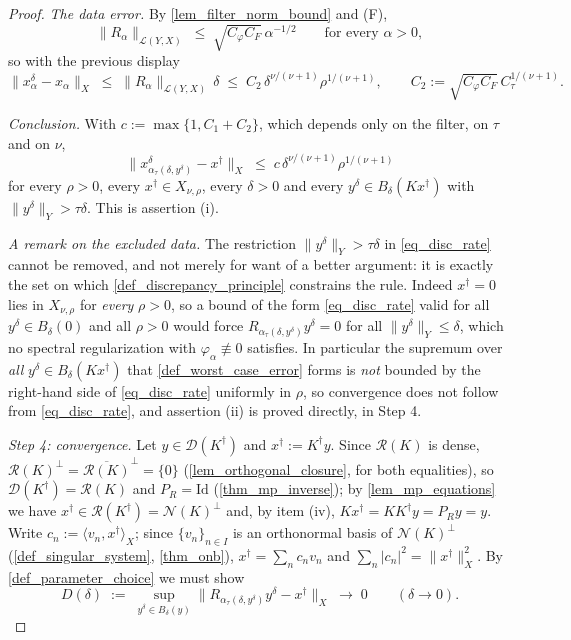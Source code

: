 \documentclass[a4paper]{report}
\theoremstyle{plain}
\theoremstyle{definition}
\theoremstyle{remark}
\newcommand{\Ll}{\mathcal{L}}
\newcommand{\Ran}{\mathcal{R}}
\newcommand{\Ker}{\mathcal{N}}
\newcommand{\Dom}{\mathcal{D}}
\newcommand{\Id}{\mathrm{Id}}
\newcommand{\dg}{^{\dagger}}
\begin{document}
\begin{proof}
  \emph{The data error.}  By \cref{lem_filter_norm_bound} and (F),
  \begin{equation}\label{eq_disc_dataerr}
    \|R_{\alpha}\|_{\Ll(Y,X)} \;\le\; \sqrt{C_{\varphi}C_F}\,\alpha^{-1/2}
    \qquad\text{for every } \alpha > 0 ,
  \end{equation}
  so with the previous display
  \[
    \|x^{\delta}_{\alpha} - x_{\alpha}\|_X \;\le\; \|R_{\alpha}\|_{\Ll(Y,X)}\,\delta
      \;\le\; C_2\,\delta^{\nu/(\nu+1)}\rho^{1/(\nu+1)},
    \qquad C_2 := \sqrt{C_{\varphi}C_F}\,C_{\tau}^{1/(\nu+1)} .
  \]

  \emph{Conclusion.}  With $c := \max\{1, C_1 + C_2\}$, which depends only on the filter,
  on $\tau$ and on $\nu$,
  \begin{equation}\label{eq_disc_rate}
    \|x^{\delta}_{\alpha_{\tau}(\delta,y^{\delta})} - x\dg\|_X \;\le\;
      c\,\delta^{\nu/(\nu+1)}\rho^{1/(\nu+1)}
  \end{equation}
  for every $\rho > 0$, every $x\dg \in X_{\nu,\rho}$, every $\delta > 0$ and every
  $y^{\delta} \in B_{\delta}(Kx\dg)$ with $\|y^{\delta}\|_Y > \tau\delta$.  This is
  assertion (i).

  \emph{A remark on the excluded data.}  The restriction $\|y^{\delta}\|_Y > \tau\delta$
  in \eqref{eq_disc_rate} cannot be removed, and not merely for want of a better
  argument: it is exactly the set on which \cref{def_discrepancy_principle} constrains
  the rule.  Indeed $x\dg = 0$ lies in $X_{\nu,\rho}$ for \emph{every} $\rho > 0$, so a
  bound of the form \eqref{eq_disc_rate} valid for all $y^{\delta} \in B_{\delta}(0)$ and
  all $\rho > 0$ would force $R_{\alpha_{\tau}(\delta,y^{\delta})}y^{\delta} = 0$ for all
  $\|y^{\delta}\|_Y \le \delta$, which no spectral regularization with
  $\varphi_{\alpha} \not\equiv 0$ satisfies.  In particular the supremum over
  \emph{all} $y^{\delta} \in B_{\delta}(Kx\dg)$ that \cref{def_worst_case_error} forms
  is \emph{not} bounded by the right-hand side of \eqref{eq_disc_rate} uniformly in
  $\rho$, so convergence does not follow from \eqref{eq_disc_rate}, and assertion (ii)
  is proved directly, in Step 4.

  \emph{Step 4: convergence.}  Let $y \in \Dom(K\dg)$ and $x\dg := K\dg y$.  Since
  $\Ran(K)$ is dense, $\Ran(K)^{\perp} = \overline{\Ran(K)}^{\perp} = \{0\}$
  (\cref{lem_orthogonal_closure}, for both equalities), so $\Dom(K\dg) = \Ran(K)$ and $P_R =
  \Id$ (\cref{thm_mp_inverse}); by \cref{lem_mp_equations} we have $x\dg \in
  \Ran(K\dg) = \Ker(K)^{\perp}$ and, by item (iv), $Kx\dg = KK\dg y = P_Ry = y$.  Write
  $c_n := \langle v_n, x\dg\rangle_X$; since $\{v_n\}_{n \in I}$ is an orthonormal basis
  of $\Ker(K)^{\perp}$ (\cref{def_singular_system}, \cref{thm_onb}),
  $x\dg = \sum_{n}c_nv_n$ and $\sum_n|c_n|^{2} = \|x\dg\|_X^{2}$.  By
  \cref{def_parameter_choice} we must show
  \[
    D(\delta) \;:=\; \sup_{y^{\delta} \in B_{\delta}(y)}
      \bigl\|R_{\alpha_{\tau}(\delta,y^{\delta})}y^{\delta} - x\dg\bigr\|_X
    \;\longrightarrow\; 0 \qquad (\delta \to 0) .
  \]


\end{proof}
\end{document}
